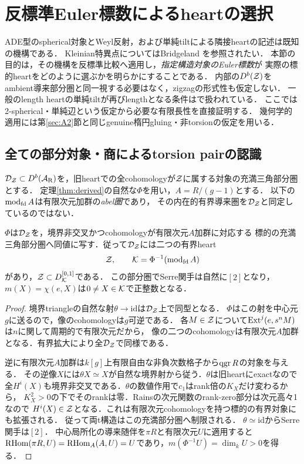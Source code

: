\section{反標準Euler標数によるheartの選択}\label{sec:rootchambers}
ADE型のspherical対象とWeyl反射，および単純tiltによる隣接heartの記述は既知の機構である．
Kleinian特異点についてはBridgeland \cite[\S2, Lemma 3.5]{BridgelandKleinian}を参照されたい．
本節の目的は，その機構を反標準比較へ適用し，\emph{指定構造対象のEuler標数}が
実際の標的heartをどのように選ぶかを明らかにすることである．
内部の$D^b(\mathcal Z)$をambient導来部分圏と同一視する必要はなく，zigzagの形式性も仮定しない．
一般のlength heartの単純tiltが再びlengthとなる条件は\cite[Theorem 2.7]{BCPW}で扱われている．
ここでは2-spherical・単純辺という仮定から必要な有限長性を直接証明する．
幾何学的適用には第\ref{sec:A2}節と同じgenuine楕円gluing・非torsionの仮定を用いる．

\subsection{全ての部分対象・商によるtorsion pairの認識}
$\mathcal D_{\mathcal Z}\subset D^b(\mathcal A_{\mathrm R})$を，旧heartでの全cohomologyが$\mathcal Z$に属する対象の充満三角部分圏とする．
定理\ref{thm:derived}の自然な$\Phi$を用い，$A=R/(g-1)$とする．
以下の$\operatorname{mod}_{\rm fd}A$は有限次元加群の\emph{abel圏}であり，
その内在的有界導来圏を$\mathcal D_{\mathcal Z}$と同定しているのではない．

\begin{lemma}\label{lem:targetfiniteheart}
$\Phi$は$\mathcal D_{\mathcal Z}$を，境界非交叉かつcohomologyが有限次元$A$加群に対応する
標的の充満三角部分圏へ同値に写す．従って$\mathcal D_{\mathcal Z}$には二つの有界heart
\[
 \mathcal Z,\qquad \mathcal K=\Phi^{-1}(\operatorname{mod}_{\rm fd}A)
\]
があり，$\mathcal Z\subset D^{[0,1]}_{\mathcal K}$である．
この部分圏でSerre関手は自然に$[2]$となり，
$m(X)=\chi(e,X)$は$0\ne X\in\mathcal K$で正整数となる．
\end{lemma}
\begin{proof}
境界triangleの自然な射$\theta\to\mathrm{id}$は$\mathcal D_{\mathcal Z}$上で同型となる．
$\Phi$はこの射を中心元$g$に送るので，像のcohomologyは$g$可逆である．
各$M\in\mathcal Z$について$\operatorname{Ext}^j(e,s^nM)$は$n$に関して周期的で有限次元だから，
像の二つのcohomologyは有限次元$A$加群となる．有界拡大により全$\mathcal D_{\mathcal Z}$で同様である．

逆に有限次元$A$加群は$k[g]$上有限自由な非負次数格子から$\operatorname{qgr} R$の対象を与える．
その逆像$X$には$\theta X\simeq X$が自然な境界射から従う．$\theta$は旧heartにexactなので
全$H^i(X)$も境界非交叉である．$\theta$の数値作用で$c_1$はrank倍の$K_X$だけ変わるから，
$K_X^2>0$の下でそのrankは零．Rainsの次元関数のrank-zero部分は次元高々1なので
$H^i(X)\in\mathcal Z$となる．これは有限次元cohomologyを持つ標的の有界対象にも拡張される．
従って両t構造はこの充満部分圏へ制限される．
$\theta\simeq\mathrm{id}$からSerre関手は$[2]$．
中心局所化の導来随伴を$\pi R$と有限次元$U$に適用すると
$\operatorname{RHom}(\pi R,U)=\operatorname{RHom}_A(A,U)=U$であり，$m(\Phi^{-1}U)=\dim_k U>0$を得る．
\end{proof}

